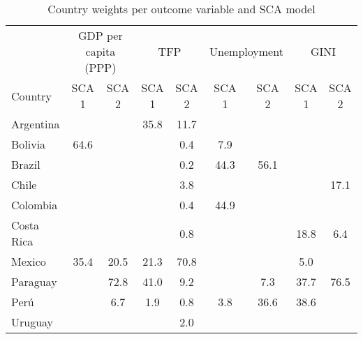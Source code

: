 \begin{table}[!h]
\begin{center}
\caption{Country weights per outcome variable and SCA model} \label{table:countries}
\begin{tabular}{l c c c c c c c c} \\ \toprule
  & \multicolumn{2}{c}{GDP per capita (PPP)} & \multicolumn{2}{c}{TFP} & \multicolumn{2}{c}{Unemployment} & \multicolumn{2}{c}{GINI}                \\ 
  Country    & SCA 1 & SCA 2 & SCA 1 & SCA 2 & SCA 1 & SCA 2 & SCA 1 & SCA 2 \\ \midrule
  Argentina  &       &       &  35.8 &  11.7 &       &       &       &       \\
  Bolivia    &  64.6 &       &       &   0.4 &   7.9 &       &       &       \\
  Brazil     &       &       &       &   0.2 &  44.3 &  56.1 &       &       \\
  Chile      &       &       &       &   3.8 &       &       &       &  17.1 \\
  Colombia   &       &       &       &   0.4 &  44.9 &       &       &       \\
  Costa Rica &       &       &       &   0.8 &       &       &  18.8 &   6.4 \\
  Mexico     &  35.4 &  20.5 &  21.3 &  70.8 &       &       &   5.0 &       \\
  Paraguay   &       &  72.8 &  41.0 &   9.2 &       &   7.3 &  37.7 &  76.5 \\
  Perú       &       &   6.7 &   1.9 &   0.8 &   3.8 &  36.6 &  38.6 &       \\
  Uruguay    &       &       &       &   2.0 &       &       &       &       \\
  \bottomrule 
\end{tabular}
\end{center}
\end{table}
